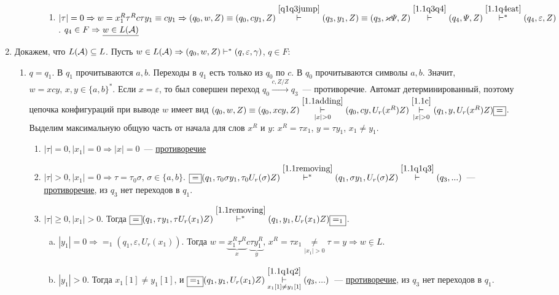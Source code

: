 \documentclass[a4paper]{article}
\def\A{{\cal A}}
\begin{document}
\begin{enumerate}[1.]
\begin{enumerate}
\begin{enumerate}
\begin{enumerate}
\item $|\tau|=0\Rightarrow w=x_1^R\tau^Rc\tau y_1\equiv cy_1\Rightarrow (q_0,w,Z)\equiv(q_0,cy_1,Z)\overset{\ref{q1q3jump}}{\vdash}(q_3,y_1,Z)\equiv(q_3,\varkappa\varPsi,Z)\overset{\ref{1.1q3q4}}{\vdash}(q_4,\varPsi,Z)\overset{\ref{1.1q4eat}}{\vdash^*}(q_4,\varepsilon,Z)$. $q_4\in F\Rightarrow \underline{w\in L(\A)}$
\end{enumerate}
\end{enumerate}
\end{enumerate}
\item Докажем, что $L(\A)\subseteq L$. Пусть $w\in L(\A)\Rightarrow (q_0,w,Z)\vdash^*(q,\varepsilon,\gamma)$, $q\in F$:\begin{enumerate}
\item \label{1.2q1} $q=q_1$. В $q_1$ прочитываются $a,b$. Переходы в $q_1$ есть только из $q_0$ по $c$. В $q_0$ прочитываются символы $a,b$. Значит, $w=xcy,\,x,y\in\{a,b\}^*$. Если $x=\varepsilon$, то был совершен переход $q_0\overset{c,Z/Z}{\longrightarrow}q_3$~--- противоречие. Автомат детерминированный, поэтому цепочка конфигураций при выводе $w$ имеет вид $(q_0,w,Z)\equiv(q_0,xcy,Z)\underset{|x|>0}{\overset{\ref{1.1adding}}{\vdash}}(q_0,cy,U_r(x^R)Z)\underset{|x|>0}{\overset{\ref{1.1c}}{\vdash}}(q_1,y,U_r(x^R)Z)\boxed{=}$. Выделим максимальную общую часть от начала для слов $x^R$ и $y$: $x^R=\tau x_1$, $y=\tau y_1$, $x_1\neq y_1$.\begin{enumerate}
\item $|\tau|=0,|x_1|=0\Rightarrow |x|=0$~--- \underline{противоречие}
\item $|\tau|>0,|x_1|=0\Rightarrow\tau=\tau_0\sigma,\,\sigma\in\{a,b\}$. $\boxed{=}(q_1,\tau_0\sigma y_1,\tau_0 U_r(\sigma)Z)\overset{\ref{1.1removing}}{\vdash^*}(q_1,\sigma y_1,U_r(\sigma)Z)\overset{\ref{1.1q1q3}}{\vdash}(q_3,...)$~--- \underline{противоречие}, из $q_3$ нет переходов в $q_1$.
\item $|\tau|\geqslant 0,|x_1|>0$. Тогда $\boxed{=}(q_1,\tau y_1,\tau U_r(x_1)Z)\overset{\ref{1.1removing}}{\vdash^*}(q_1,y_1,U_r(x_1)Z)\boxed{=_1}$.\begin{enumerate}[a.]
\item $|y_1|=0\Rightarrow\boxed{=_1}(q_1,\varepsilon,U_r(x_1))$. Тогда $w=\underbrace{x_1^R\tau^R}_{x}c\underbrace{\tau y_1^R}_y,\,x^R=\tau x_1\underset{|x_1|>0}{\neq}\tau=y\Rightarrow\underline{w\in L}$.
\item $|y_1|>0$. Тогда $x_1[1]\neq y_1[1]$, и $\boxed{=_1}(q_1,y_1,U_r(x_1)Z)\underset{x_1[1]\neq y_1[1]}{\overset{\ref{1.1q1q2}}{\vdash}}(q_3,...)$~--- \underline{противоречие}, из $q_3$ нет переходов в $q_1$.

\end{enumerate}
\end{enumerate}
\end{enumerate}
\end{enumerate}
\end{document}
